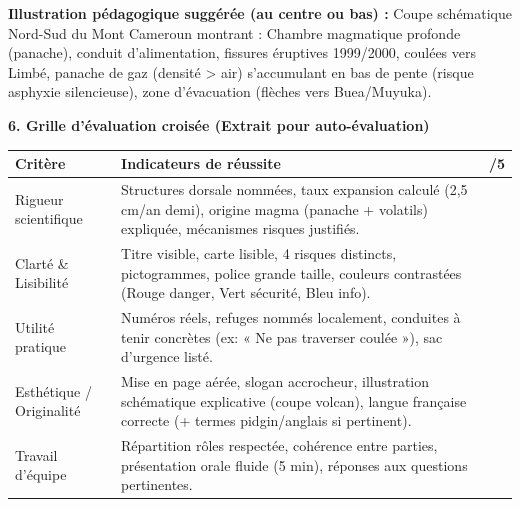 \documentclass[11pt]{article}
\begin{document}
\begin{exoresolu}
\par
\textbf{Illustration pédagogique suggérée (au centre ou bas) :} Coupe schématique Nord-Sud du Mont Cameroun montrant : Chambre magmatique profonde (panache), conduit d'alimentation, fissures éruptives 1999/2000, coulées vers Limbé, panache de gaz  (densité > air) s'accumulant en bas de pente (risque asphyxie silencieuse), zone d'évacuation (flèches vers Buea/Muyuka).

\textbf{6. Grille d'évaluation croisée (Extrait pour auto-évaluation)}
\begin{center}
\begin{tabularx}{\linewidth}{|l|X|c|}\hline
\textbf{Critère} & \textbf{Indicateurs de réussite} & \textbf{/5} \\ \hline
Rigueur scientifique & Structures dorsale nommées, taux expansion calculé (2,5 cm/an demi), origine magma (panache + volatils) expliquée, mécanismes risques justifiés. & \\
Clarté \& Lisibilité & Titre visible, carte lisible, 4 risques distincts, pictogrammes, police grande taille, couleurs contrastées (Rouge danger, Vert sécurité, Bleu info). & \\
Utilité pratique & Numéros réels, refuges nommés localement, conduites à tenir concrètes (ex: « Ne pas traverser coulée »), sac d'urgence listé. & \\
Esthétique / Originalité & Mise en page aérée, slogan accrocheur, illustration schématique explicative (coupe volcan), langue française correcte (+ termes pidgin/anglais si pertinent). & \\
Travail d'équipe & Répartition rôles respectée, cohérence entre parties, présentation orale fluide (5 min), réponses aux questions pertinentes. & \\ \hline
\end{tabularx}
\end{center}
\end{exoresolu}
\end{document}
